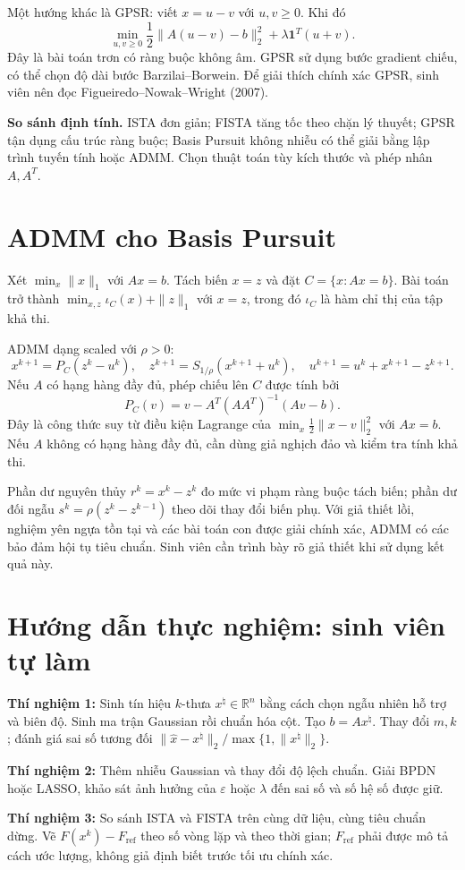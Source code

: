 \documentclass[12pt,a4paper]{article}
\newcommand{\R}{\mathbb R}\newcommand{\supp}{\operatorname{supp}}\newcommand{\spark}{\operatorname{spark}}
\begin{document}
Một hướng khác là GPSR: viết $x=u-v$ với $u,v\ge0$. Khi đó
\[\min_{u,v\ge0}\frac12\|A(u-v)-b\|_2^2+\lambda\mathbf1^T(u+v).\]
Đây là bài toán trơn có ràng buộc không âm. GPSR sử dụng bước gradient chiếu, có thể chọn độ dài bước Barzilai--Borwein. Để giải thích chính xác GPSR, sinh viên nên đọc Figueiredo--Nowak--Wright (2007).

\textbf{So sánh định tính.} ISTA đơn giản; FISTA tăng tốc theo chặn lý thuyết; GPSR tận dụng cấu trúc ràng buộc; Basis Pursuit không nhiễu có thể giải bằng lập trình tuyến tính hoặc ADMM. Chọn thuật toán tùy kích thước và phép nhân $A,A^T$.
\clearpage
\section{ADMM cho Basis Pursuit}
Xét $\min_x\|x\|_1$ với $Ax=b$. Tách biến $x=z$ và đặt $C=\{x:Ax=b\}$. Bài toán trở thành $\min_{x,z}\iota_C(x)+\|z\|_1$ với $x=z$, trong đó $\iota_C$ là hàm chỉ thị của tập khả thi.

ADMM dạng scaled với $\rho>0$:
\[x^{k+1}=P_C(z^k-u^k),\quad z^{k+1}=S_{1/\rho}(x^{k+1}+u^k),\quad u^{k+1}=u^k+x^{k+1}-z^{k+1}.\]
Nếu $A$ có hạng hàng đầy đủ, phép chiếu lên $C$ được tính bởi
\[P_C(v)=v-A^T(AA^T)^{-1}(Av-b).\]
Đây là công thức suy từ điều kiện Lagrange của $\min_x\frac12\|x-v\|_2^2$ với $Ax=b$. Nếu $A$ không có hạng hàng đầy đủ, cần dùng giả nghịch đảo và kiểm tra tính khả thi.

Phần dư nguyên thủy $r^k=x^k-z^k$ đo mức vi phạm ràng buộc tách biến; phần dư đối ngẫu $s^k=\rho(z^k-z^{k-1})$ theo dõi thay đổi biến phụ. Với giả thiết lồi, nghiệm yên ngựa tồn tại và các bài toán con được giải chính xác, ADMM có các bảo đảm hội tụ tiêu chuẩn. Sinh viên cần trình bày rõ giả thiết khi sử dụng kết quả này.
\clearpage
\section{Hướng dẫn thực nghiệm: sinh viên tự làm}
\textbf{Thí nghiệm 1:} Sinh tín hiệu $k$-thưa $x^\natural\in\R^n$ bằng cách chọn ngẫu nhiên hỗ trợ và biên độ. Sinh ma trận Gaussian rồi chuẩn hóa cột. Tạo $b=Ax^\natural$. Thay đổi $m,k$; đánh giá sai số tương đối $\|\widehat x-x^\natural\|_2/\max\{1,\|x^\natural\|_2\}$.

\textbf{Thí nghiệm 2:} Thêm nhiễu Gaussian và thay đổi độ lệch chuẩn. Giải BPDN hoặc LASSO, khảo sát ảnh hưởng của $\varepsilon$ hoặc $\lambda$ đến sai số và số hệ số được giữ.

\textbf{Thí nghiệm 3:} So sánh ISTA và FISTA trên cùng dữ liệu, cùng tiêu chuẩn dừng. Vẽ $F(x^k)-F_{\mathrm{ref}}$ theo số vòng lặp và theo thời gian; $F_{\mathrm{ref}}$ phải được mô tả cách ước lượng, không giả định biết trước tối ưu chính xác.
\end{document}
